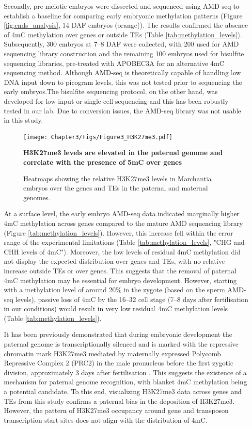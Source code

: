 Secondly, pre-meiotic embryos were dissected and sequenced using AMD-seq to establish a baseline for comparing early embryonic methylation patterns (Figure \ref{fig:ends_analysis}, 14 DAF embryos (orange)). The results confirmed the absence of 4mC methylation over genes or outside TEs (Table \ref{tab:methylation_levels}). Subsequently, 300 embryos at 7–8 DAF were collected, with 200 used for AMD sequencing library construction and the remaining 100 embryos used for bisulfite sequencing libraries, pre-treated with APOBEC3A for an alternative 4mC sequencing method. Although AMD-seq is theoretically capable of handling low DNA input down to picogram levels\cite{idtdna_methylseq_kit}, this was not tested prior to sequencing the early embryos.The bisulfite sequencing protocol, on the other hand, was developed for low-input or single-cell sequencing and this has been robustly tested in our lab. Due to conversion issues, the AMD-seq library was not usable in this study. 

\begin{figure}[htbp!] 
\centering    
    \texttt{[image: Chapter3/Figs/Figure3\_H3K27me3.pdf]}
\caption{\textbf{H3K27me3 levels are elevated in the paternal genome and correlate with the presence of 5mC over genes}}
\label{fig:h3k27me3}
\captionsetup{font=small}
    \caption*{Heatmaps showing the relative H3K27me3 levels in Marchantia embryos over the genes and TEs in the paternal and maternal genomes.}
\end{figure}

At a surface level, the early embryo AMD-seq data indicated marginally higher 4mC methylation across genes compared to the mature AMD sequencing library (Figure \ref{tab:methylation_levels}). However, this increase fell within the error range of the experimental limitations (Table \ref{tab:methylation_levels}, "CHG and CHH levels of 4mC"). Moreover, the low levels of residual 4mC methylation did not display the expected distribution over genes and TEs, with no relative increase outside TEs or over genes. This suggests that the removal of paternal 4mC methylation may be essential for embryo development. However, starting with a methylation level of around 20\% in the zygote (based on the sperm AMD-seq levels), passive loss of 4mC by the 16–32 cell stage (7–8 days after fertilisation in our conditions) would result in very low residual 4mC methylation levels (Table \ref{tab:methylation_levels}). 

It has been previously demonstrated that during embryonic development the paternal genome is transcriptionally silenced and is marked with the repressive chromatin mark H3K27me3 mediated by maternally expressed Polycomb Repressive Complex 2 (PRC2) in the male pronucleus before the first zygotic division, approximately 3 days after fertilisation \cite{RN160}. This suggests the existence of a mechanism for paternal genome recognition, with blanket 4mC methylation being a potential candidate. To this end, visualizing H3K27me3 data across genes and TEs from this study confirms a paternal bias in the deposition of H3K27me3. However, the pattern of H3K27me3 occupancy around gene and transposon transcription start sites does not align with the distribution of 4mC.

